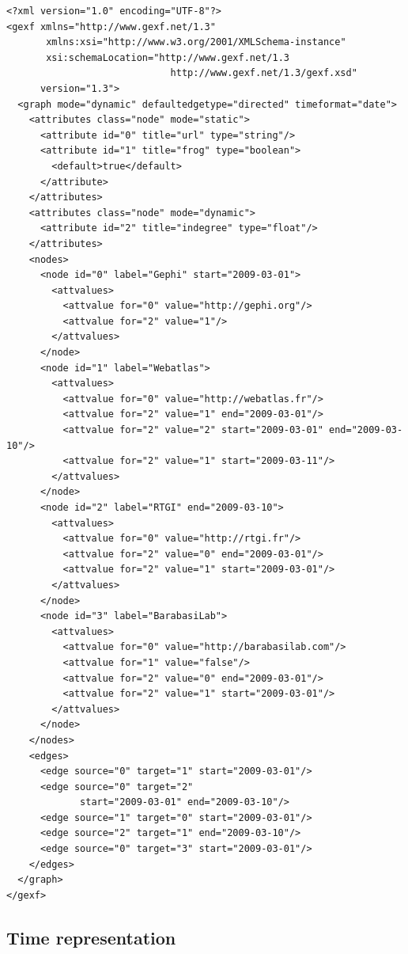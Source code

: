 \documentclass[a4paper,10pt]{article}
\begin{document}
\lstset{ style=gexf }
\begin{lstlisting}[caption={A (small) Dynamic Web Graph with date format},label=dynwebgraph]
<?xml version="1.0" encoding="UTF-8"?>
<gexf xmlns="http://www.gexf.net/1.3"
       xmlns:xsi="http://www.w3.org/2001/XMLSchema-instance"
       xsi:schemaLocation="http://www.gexf.net/1.3
                             http://www.gexf.net/1.3/gexf.xsd"
      version="1.3">
  <graph mode="dynamic" defaultedgetype="directed" timeformat="date">
    <attributes class="node" mode="static">
      <attribute id="0" title="url" type="string"/>
      <attribute id="1" title="frog" type="boolean">
        <default>true</default>
      </attribute>
    </attributes>
    <attributes class="node" mode="dynamic">
      <attribute id="2" title="indegree" type="float"/>
    </attributes>
    <nodes>
      <node id="0" label="Gephi" start="2009-03-01">
        <attvalues>
          <attvalue for="0" value="http://gephi.org"/>
          <attvalue for="2" value="1"/>
        </attvalues>
      </node>
      <node id="1" label="Webatlas">
        <attvalues>
          <attvalue for="0" value="http://webatlas.fr"/>
          <attvalue for="2" value="1" end="2009-03-01"/>
          <attvalue for="2" value="2" start="2009-03-01" end="2009-03-10"/>
          <attvalue for="2" value="1" start="2009-03-11"/>
        </attvalues>
      </node>
      <node id="2" label="RTGI" end="2009-03-10">
        <attvalues>
          <attvalue for="0" value="http://rtgi.fr"/>
          <attvalue for="2" value="0" end="2009-03-01"/>
          <attvalue for="2" value="1" start="2009-03-01"/>
        </attvalues>
      </node>
      <node id="3" label="BarabasiLab">
        <attvalues>
          <attvalue for="0" value="http://barabasilab.com"/>
          <attvalue for="1" value="false"/>
          <attvalue for="2" value="0" end="2009-03-01"/>
          <attvalue for="2" value="1" start="2009-03-01"/>
        </attvalues>
      </node>
    </nodes>
    <edges>
      <edge source="0" target="1" start="2009-03-01"/>
      <edge source="0" target="2"
             start="2009-03-01" end="2009-03-10"/>
      <edge source="1" target="0" start="2009-03-01"/>
      <edge source="2" target="1" end="2009-03-10"/>
      <edge source="0" target="3" start="2009-03-01"/>
    </edges>
  </graph>
</gexf>
\end{lstlisting}

\subsection{Time representation}
\end{document}
